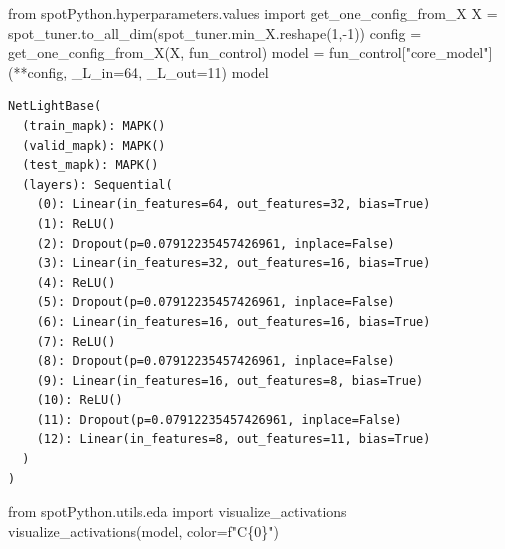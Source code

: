 \documentclass[
  letterpaper,
  DIV=11,
  numbers=noendperiod]{scrreprt}
\newenvironment{Shaded}{\begin{snugshade}}{\end{snugshade}}
\newcommand{\DecValTok}[1]{\textcolor[rgb]{0.68,0.00,0.00}{#1}}
\newcommand{\ImportTok}[1]{\textcolor[rgb]{0.00,0.46,0.62}{#1}}
\newcommand{\NormalTok}[1]{\textcolor[rgb]{0.00,0.23,0.31}{#1}}
\newcommand{\OperatorTok}[1]{\textcolor[rgb]{0.37,0.37,0.37}{#1}}
\newcommand{\SpecialCharTok}[1]{\textcolor[rgb]{0.37,0.37,0.37}{#1}}
\newcommand{\SpecialStringTok}[1]{\textcolor[rgb]{0.13,0.47,0.30}{#1}}
\newcommand{\StringTok}[1]{\textcolor[rgb]{0.13,0.47,0.30}{#1}}
\begin{document}
\begin{Shaded}
\begin{Highlighting}[]
\ImportTok{from}\NormalTok{ spotPython.hyperparameters.values }\ImportTok{import}\NormalTok{ get\_one\_config\_from\_X}
\NormalTok{X }\OperatorTok{=}\NormalTok{ spot\_tuner.to\_all\_dim(spot\_tuner.min\_X.reshape(}\DecValTok{1}\NormalTok{,}\OperatorTok{{-}}\DecValTok{1}\NormalTok{))}
\NormalTok{config }\OperatorTok{=}\NormalTok{ get\_one\_config\_from\_X(X, fun\_control)}
\NormalTok{model }\OperatorTok{=}\NormalTok{ fun\_control[}\StringTok{"core\_model"}\NormalTok{](}\OperatorTok{**}\NormalTok{config, \_L\_in}\OperatorTok{=}\DecValTok{64}\NormalTok{, \_L\_out}\OperatorTok{=}\DecValTok{11}\NormalTok{)}
\NormalTok{model}
\end{Highlighting}
\end{Shaded}

\begin{verbatim}
NetLightBase(
  (train_mapk): MAPK()
  (valid_mapk): MAPK()
  (test_mapk): MAPK()
  (layers): Sequential(
    (0): Linear(in_features=64, out_features=32, bias=True)
    (1): ReLU()
    (2): Dropout(p=0.07912235457426961, inplace=False)
    (3): Linear(in_features=32, out_features=16, bias=True)
    (4): ReLU()
    (5): Dropout(p=0.07912235457426961, inplace=False)
    (6): Linear(in_features=16, out_features=16, bias=True)
    (7): ReLU()
    (8): Dropout(p=0.07912235457426961, inplace=False)
    (9): Linear(in_features=16, out_features=8, bias=True)
    (10): ReLU()
    (11): Dropout(p=0.07912235457426961, inplace=False)
    (12): Linear(in_features=8, out_features=11, bias=True)
  )
)
\end{verbatim}

\begin{Shaded}
\begin{Highlighting}[]
\ImportTok{from}\NormalTok{ spotPython.utils.eda }\ImportTok{import}\NormalTok{ visualize\_activations}
\NormalTok{visualize\_activations(model, color}\OperatorTok{=}\SpecialStringTok{f"C}\SpecialCharTok{\{}\DecValTok{0}\SpecialCharTok{\}}\SpecialStringTok{"}\NormalTok{)}
\end{Highlighting}
\end{Shaded}
\end{document}
